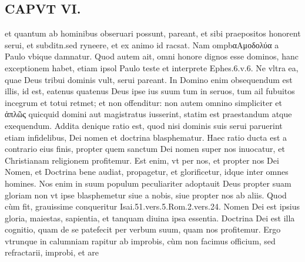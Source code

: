 \documentclass{article}
\begin{document}
\begin{pages}
\section*{CAPVT  VI. }
\marginpar{[ p.415 ]}\pstart et quantum ab hominibus obseruari possunt, pareant, et sibi praepositos honorent serui, et subditn.sed ryneere, et ex animo id racsat. Nam ompbαAμοδολύα a Paulo vbique damnatur.  \pend\pstart Quod autem ait, omni honore dignos esse dominos, hanc exceptionem habet, etiam ipsol Paulo teste et interprete Ephes.6.v.6. Ne vltra ea, quae Deus tribui dominis vult, serui pareant. In Domino enim obsequendum est illis, id est, eatenus quatenus Deus ipse ius suum tum in seruos, tum ail fubuitos incegrum et totui retmet; et non offenditur: non autem omnino simpliciter et ἀπλῶς quicquid domini aut magistratus iusserint, statim est praestandum atque exequendum.  \pend\pstart Addita denique ratio est, quod nisi dominis suis serui paruerint etiam infidelibus, Dei nomen et doctrina blasphematur. Haec ratio ducta est a contrario eius finis, propter quem sanctum Dei nomen super nos inuocatur, et Christianam religionem profitemur. Est enim, vt per nos, et propter nos Dei Nomen, et Doctrina bene audiat, propagetur, et glorificetur, idque inter omnes homines. Nos enim in suum populum peculiariter adoptauit Deus propter suam gloriam non vt ipse blasphemetur siue a nobis, siue propter nos ab aliis. Quod cùm fit, grauissime conqueritur Isai.51.vers.5.Rom.2.vers.24.  \pend\pstart Nomen Dei est ipsius gloria, maiestas, sapientia, et tanquam diuina ipsa essentia. Doctrina Dei est illa cognitio, quam de se patefecit per verbum suum, quam nos profitemur. Ergo vtrunque in calumniam rapitur ab improbis, cùm non facimus officium, sed refractarii, improbi, et are  \pend

\end{pages}
\end{document}
